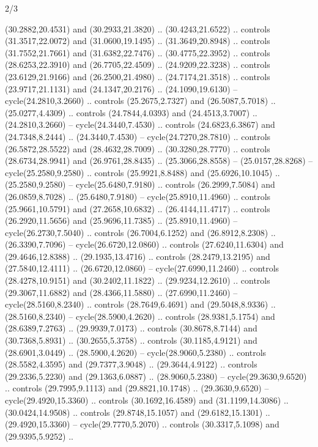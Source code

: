 \begin{flagdescription}{2/3}
\begin{scope}[yshift=\flagwidth,scale=\flagwidth/1241.93737]
\begin{scope}[y=-1mm, x=1mm,draw=gold,fill=blue,line join=miter,miter limit=4,line width=1.8\lw]
\begin{scope}[y=1mm, x=1mm, yscale=-1,shift={(573.68mm+\str,145.75)}]
\begin{scope}[scale=1.35,shift={(-9,-3)}]
\begin{scope}[scale=0.55]
\begin{scope}[scale=1.333]
    (30.2882,20.4531) and (30.2933,21.3820) .. (30.4243,21.6522) .. controls
    (31.3517,22.0072) and (31.0600,19.1495) .. (31.3649,20.8948) .. controls
    (31.7552,21.7661) and (31.6382,22.7476) .. (30.4775,22.3952) .. controls
    (28.6253,22.3910) and (26.7705,22.4509) .. (24.9209,22.3238) .. controls
    (23.6129,21.9166) and (26.2500,21.4980) .. (24.7174,21.3518) .. controls
    (23.9717,21.1131) and (24.1347,20.2176) .. (24.1090,19.6130) --
    cycle(24.2810,3.2660) .. controls (25.2675,2.7327) and (26.5087,5.7018) ..
    (25.0277,4.4309) .. controls (24.7844,4.0393) and (24.4513,3.7007) ..
    (24.2810,3.2660) -- cycle(24.3440,7.4530) .. controls (24.6823,6.3867) and
    (24.7348,8.2444) .. (24.3440,7.4530) -- cycle(24.7270,28.7810) .. controls
    (26.5872,28.5522) and (28.4632,28.7009) .. (30.3280,28.7770) .. controls
    (28.6734,28.9941) and (26.9761,28.8435) .. (25.3066,28.8558) --
    (25.0157,28.8268) -- cycle(25.2580,9.2580) .. controls (25.9921,8.8488) and
    (25.6926,10.1045) .. (25.2580,9.2580) -- cycle(25.6480,7.9180) .. controls
    (26.2999,7.5084) and (26.0859,8.7028) .. (25.6480,7.9180) --
    cycle(25.8910,11.4960) .. controls (25.9661,10.5791) and (27.2658,10.6832) ..
    (26.4144,11.4717) .. controls (26.2920,11.5656) and (25.9696,11.7385) ..
    (25.8910,11.4960) -- cycle(26.2730,7.5040) .. controls (26.7004,6.1252) and
    (26.8912,8.2308) .. (26.3390,7.7096) -- cycle(26.6720,12.0860) .. controls
    (27.6240,11.6304) and (29.4646,12.8388) .. (29.1935,13.4716) .. controls
    (28.2479,13.2195) and (27.5840,12.4111) .. (26.6720,12.0860) --
    cycle(27.6990,11.2460) .. controls (28.4278,10.9151) and (30.2402,11.1822) ..
    (29.9234,12.2610) .. controls (29.3067,11.6882) and (28.4366,11.5880) ..
    (27.6990,11.2460) -- cycle(28.5160,8.2340) .. controls (28.7649,6.4691) and
    (29.5048,8.9336) .. (28.5160,8.2340) -- cycle(28.5900,4.2620) .. controls
    (28.9381,5.1754) and (28.6389,7.2763) .. (29.9939,7.0173) .. controls
    (30.8678,8.7144) and (30.7368,5.8931) .. (30.2655,5.3758) .. controls
    (30.1185,4.9121) and (28.6901,3.0449) .. (28.5900,4.2620) --
    cycle(28.9060,5.2380) .. controls (28.5582,4.3595) and (29.7377,3.9048) ..
    (29.3644,4.9122) .. controls (29.2336,5.2230) and (29.1363,6.0887) ..
    (28.9060,5.2380) -- cycle(29.3630,9.6520) .. controls (29.7995,9.1113) and
    (29.8821,10.1748) .. (29.3630,9.6520) -- cycle(29.4920,15.3360) .. controls
    (30.1692,16.4589) and (31.1199,14.3086) .. (30.0424,14.9508) .. controls
    (29.8748,15.1057) and (29.6182,15.1301) .. (29.4920,15.3360) --
    cycle(29.7770,5.2070) .. controls (30.3317,5.1098) and (29.9395,5.9252) ..

\end{scope}
\end{scope}
\end{scope}
\end{scope}
\end{scope}
\end{scope}
\end{flagdescription}
